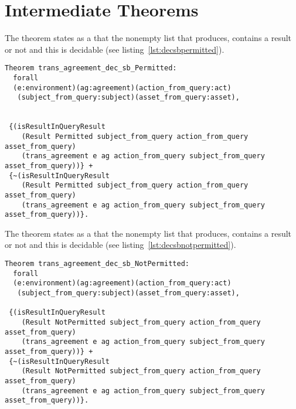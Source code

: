  

\section{Intermediate Theorems}\label{sec:intermediatetheorems}
The theorem  states as a  that the nonempty list that  produces, contains a  result or not and this is decidable (see listing~\ref{lst:decsbpermitted}).


\begin{lstlisting}
Theorem trans_agreement_dec_sb_Permitted:
  forall
  (e:environment)(ag:agreement)(action_from_query:act)
   (subject_from_query:subject)(asset_from_query:asset),


 {(isResultInQueryResult 
    (Result Permitted subject_from_query action_from_query asset_from_query)
    (trans_agreement e ag action_from_query subject_from_query asset_from_query))} +
 {~(isResultInQueryResult 
    (Result Permitted subject_from_query action_from_query asset_from_query)
    (trans_agreement e ag action_from_query subject_from_query asset_from_query))}.

\end{lstlisting}

The theorem  states as a  that the nonempty list that  produces, contains a  result or not and this is decidable (see listing~\ref{lst:decsbnotpermitted}).

\begin{lstlisting}
Theorem trans_agreement_dec_sb_NotPermitted:
  forall
  (e:environment)(ag:agreement)(action_from_query:act)
   (subject_from_query:subject)(asset_from_query:asset),

 {(isResultInQueryResult 
    (Result NotPermitted subject_from_query action_from_query asset_from_query)
    (trans_agreement e ag action_from_query subject_from_query asset_from_query))} +
 {~(isResultInQueryResult 
    (Result NotPermitted subject_from_query action_from_query asset_from_query)
    (trans_agreement e ag action_from_query subject_from_query asset_from_query))}.

\end{lstlisting}

